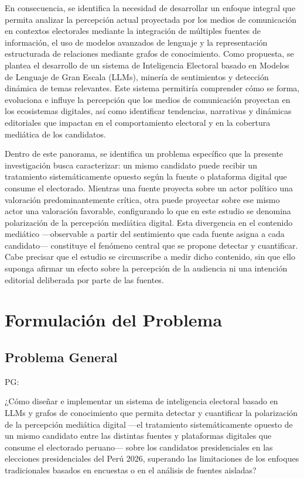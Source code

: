 En consecuencia, se identifica la necesidad de desarrollar un enfoque integral que permita analizar la percepción actual proyectada por los medios de comunicación en contextos electorales mediante la integración de múltiples fuentes de información, el uso de modelos avanzados de lenguaje y la representación estructurada de relaciones mediante grafos de conocimiento. Como propuesta, se plantea el desarrollo de un sistema de Inteligencia Electoral basado en Modelos de Lenguaje de Gran Escala (LLMs), minería de sentimientos y detección dinámica de temas relevantes. Este sistema permitiría comprender cómo se forma, evoluciona e influye la percepción que los medios de comunicación proyectan en los ecosistemas digitales, así como identificar tendencias, narrativas y dinámicas editoriales que impactan en el comportamiento electoral y en la cobertura mediática de los candidatos.

Dentro de este panorama, se identifica un problema específico que la presente investigación busca caracterizar: un mismo candidato puede recibir un tratamiento sistemáticamente opuesto según la fuente o plataforma digital que consume el electorado. Mientras una fuente proyecta sobre un actor político una valoración predominantemente crítica, otra puede proyectar sobre ese mismo actor una valoración favorable, configurando lo que en este estudio se denomina polarización de la percepción mediática digital. Esta divergencia en el contenido mediático —observable a partir del sentimiento que cada fuente asigna a cada candidato— constituye el fenómeno central que se propone detectar y cuantificar. Cabe precisar que el estudio se circunscribe a medir dicho contenido, sin que ello suponga afirmar un efecto sobre la percepción de la audiencia ni una intención editorial deliberada por parte de las fuentes.

\section{Formulación del Problema}

\subsection{Problema General}
PG: \newcommand{\ProblemaGeneral}{
¿Cómo diseñar e implementar un sistema de inteligencia electoral basado en LLMs y grafos de conocimiento que permita detectar y cuantificar la polarización de la percepción mediática digital —el tratamiento sistemáticamente opuesto de un mismo candidato entre las distintas fuentes y plataformas digitales que consume el electorado peruano— sobre los candidatos presidenciales en las elecciones presidenciales del Perú 2026, superando las limitaciones de los enfoques tradicionales basados en encuestas o en el análisis de fuentes aisladas?
}
\ProblemaGeneral

